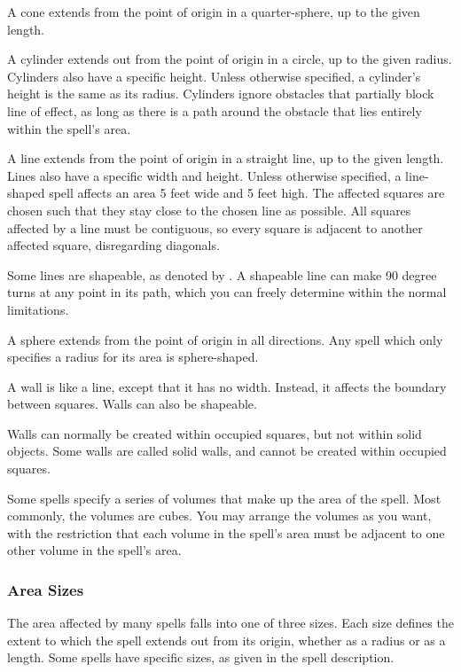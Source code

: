  A cone extends from the point of origin in a quarter-sphere, up to the given length.

 A cylinder extends out from the point of origin in a circle, up to the given radius. Cylinders also have a specific height. Unless otherwise specified, a cylinder's height is the same as its radius. Cylinders ignore obstacles that partially block line of effect, as long as there is a path around the obstacle that lies entirely within the spell's area.

 A line extends from the point of origin in a straight line, up to the given length. Lines also have a specific width and height. Unless otherwise specified, a line-shaped spell affects an area 5 feet wide and 5 feet high. The affected squares are chosen such that they stay close to the chosen line as possible. All squares affected by a line must be contiguous, so every square is adjacent to another affected square, disregarding diagonals.

\label{Shapeable} Some lines are shapeable, as denoted by \shapeable. A shapeable line can make 90 degree turns at any point in its path, which you can freely determine within the normal limitations.

 A sphere extends from the point of origin in all directions. Any spell which only specifies a radius for its area is sphere-shaped.

 A wall is like a line, except that it has no width. Instead, it affects the boundary between squares. Walls can also be shapeable.

Walls can normally be created within occupied squares, but not within solid objects. Some walls are called solid walls, and cannot be created within occupied squares.

 Some spells specify a series of volumes that make up the area of the spell. Most commonly, the volumes are cubes. You may arrange the volumes as you want, with the restriction that each volume in the spell's area must be adjacent to one other volume in the spell's area.

\subsubsection{Area Sizes}

The area affected by many spells falls into one of three sizes. Each size defines the extent to which the spell extends out from its origin, whether as a radius or as a length. Some spells have specific sizes, as given in the spell description.

